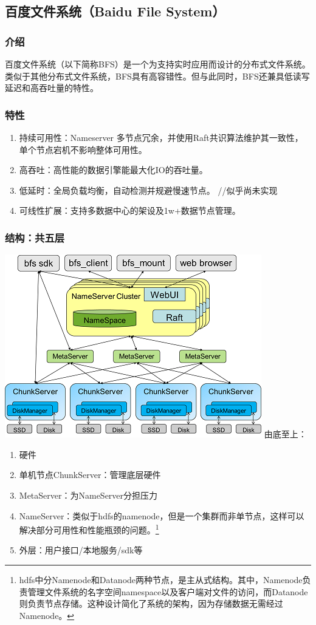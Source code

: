 \documentclass{ctexart}
\begin{document}
\subsection{百度文件系统（Baidu File System）}
\subsubsection{介绍}
百度文件系统（以下简称BFS）是一个为支持实时应用而设计的分布式文件系统。类似于其他分布式文件系统，BFS具有高容错性。但与此同时，BFS还兼具低读写延迟和高吞吐量的特性。\cite{BFS}
\subsubsection{特性}
\begin{enumerate}
	\item 持续可用性：Nameserver 多节点冗余，并使用Raft共识算法维护其一致性，单个节点宕机不影响整体可用性。
	\item 高吞吐：高性能的数据引擎能最大化IO的吞吐量。
	\item 低延时：全局负载均衡，自动检测并规避慢速节点。 //似乎尚未实现
	\item 可线性扩展：支持多数据中心的架设及1w+数据节点管理。
\end{enumerate}
\subsubsection{结构：共五层}
\includegraphics[width=\textwidth]{bfs.jpg}
由底至上：
\begin{enumerate}
	\item 硬件
	\item 单机节点ChunkServer：管理底层硬件
	\item MetaServer：为NameServer分担压力
	\item NameServer：类似于hdfs的namenode，但是一个集群而非单节点，这样可以解决部分可用性和性能瓶颈的问题。\footnote{hdfs中分Namenode和Datanode两种节点，是主从式结构。其中，Namenode负责管理文件系统的名字空间namespace以及客户端对文件的访问，而Datanode则负责节点存储。这种设计简化了系统的架构，因为存储数据无需经过Namenode。}
	\item 外层：用户接口/本地服务/sdk等
\end{enumerate}
\end{document}
